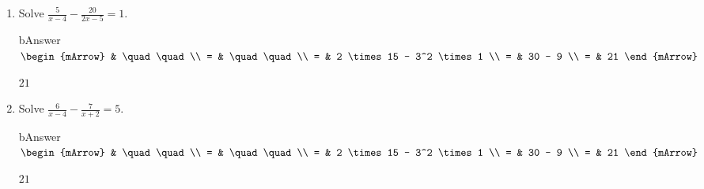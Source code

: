 \clearpage
\begin{enumerate}
  \item \begin{exercise} Solve $ \frac{5}{x-4} - \frac{20}{2x-5} = 1 $.
        \begin{envOut}[height=11cm]{bAnswer}
		     $\begin{mArrow}
		        & \quad\quad                      \\ 
              = & \quad\quad                      \\ 
              = & 2 \times 15 - 3^2 \times 1      \\ 
              = & 30 - 9                          \\
              = & 21						  
	         \end{mArrow}$
        \end{envOut}			  
	    \begin{shortsolution}$21$\end{shortsolution}
	  \end{exercise}

  \item \begin{exercise} Solve $ \frac{6}{x-4} - \frac{7}{x+2} = 5 $.
        \begin{envOut}[height=11cm]{bAnswer}
		     $\begin{mArrow}
		        & \quad\quad                      \\ 
              = & \quad\quad      \\ 
              = & 2 \times 15 - 3^2 \times 1     \\ 
              = & 30 - 9                       \\
              = & 21						  
	         \end{mArrow}$
        \end{envOut}			  
	    \begin{shortsolution}$21$\end{shortsolution}
	  \end{exercise}
\end{enumerate}


